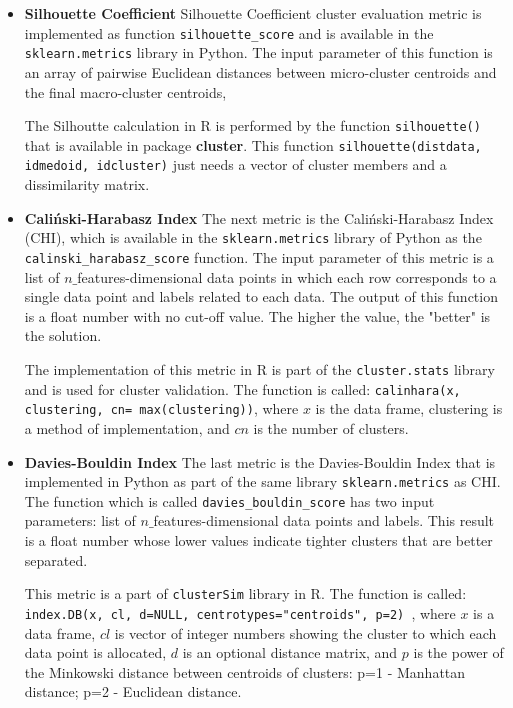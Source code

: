 \documentclass[../UNBThesis2.tex]{subfiles}
\begin{document}
\begin{itemize}
    

\item\textbf{Silhouette Coefficient}
Silhouette Coefficient cluster evaluation metric is implemented as function \texttt{silhouette\_score} and is available in the \texttt{sklearn.metrics} library in Python.  The input parameter of this function is an array of pairwise Euclidean distances between micro-cluster centroids and the final macro-cluster centroids, %

The Silhoutte calculation in R is performed by the function \texttt{silhouette()} that is available in package \textbf{cluster}. This function \texttt{silhouette(distdata, idmedoid, idcluster)} just needs a vector of cluster members and a dissimilarity matrix.




\item\textbf{Caliński-Harabasz Index}
The next metric is the Caliński-Harabasz Index (CHI), which is available in the \texttt{sklearn.metrics} library of Python as the \texttt{calinski\_harabasz\_score} function. The input parameter of this metric is a list of $n\_$features-dimensional data points in which each row corresponds to a single data point and labels related to each data. The output of this function is a float number with no cut-off value. The higher the value, the "better" is the solution.

The implementation of this metric in R is part of the \texttt{cluster.stats} library and is used for cluster validation. The function is called: \texttt{calinhara(x, clustering, cn= max(clustering))}, where $x$ is the data frame, clustering is a method of implementation, and $cn$ is the number of clusters.



\item\textbf{Davies-Bouldin Index}
The last metric is the Davies-Bouldin Index that is implemented in Python as part of the same library \texttt{sklearn.metrics} as CHI. The function which is called \texttt{davies\_bouldin\_score} has two input parameters: list of $n\_$features-dimensional data points and labels. This result is a float number whose lower values indicate tighter clusters that are better separated.


This metric is a part of \texttt{clusterSim} library in R. The function is called: \texttt{index.DB(x, cl, d=NULL, centrotypes="centroids", p=2) }, where $x$ is a data frame, $cl$ is vector of integer numbers showing the cluster to which each data point is allocated, $d$ is an optional distance matrix, and $p$ is the power of the Minkowski distance between centroids of clusters: p=1 - Manhattan distance; p=2 - Euclidean distance.


\end{itemize}
\end{document}
